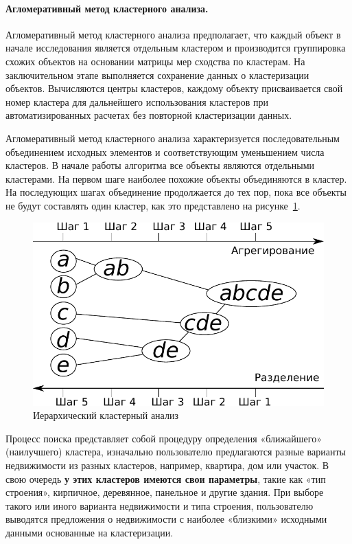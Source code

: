 \documentclass[a4paper,14pt,openany,final]{extreport} %
\def\oldcaption{} \let\oldcaption=\caption
\def\caption{\stepcounter{captionsnum}\oldcaption}
\begin{document}
{\paragraph{Агломеративный метод кластерного анализа.}
Агломеративный метод кластерного анализа предполагает, что каждый объект в начале исследования является отдельным кластером и производится группировка схожих объектов на основании матрицы мер сходства по кластерам. На заключительном этапе выполняется сохранение данных о кластеризации объектов. Вычисляются центры кластеров, каждому объекту присваивается свой номер кластера для дальнейшего использования кластеров при автоматизированных расчетах без повторной кластеризации данных.

Агломеративный метод кластерного анализа характеризуется последовательным объединением исходных элементов и соответствующим уменьшением числа кластеров. В начале работы алгоритма все объекты являются отдельными кластерами. На первом шаге наиболее похожие объекты объединяются в кластер. На последующих шагах объединение продолжается до тех пор, пока все объекты не будут составлять один кластер, как это представлено на рисунке~\ref{fig:hclustdescr}.

\begin{figure}[htbp]
  \centering
  \includegraphics[width=0.5\linewidth]{hclustexp.pdf}
  \caption{Иерархический кластерный анализ}
  \label{fig:hclustdescr}
\end{figure}


Процесс поиска представляет собой процедуру определения «ближайшего» (наилучшего) кластера, изначально пользователю предлагаются разные варианты недвижимости из разных кластеров, например, квартира, дом или участок. В свою очередь\textbf{ у этих кластеров имеются свои параметры}, такие как «тип строения», кирпичное, деревянное, панельное и другие здания. При выборе такого или иного варианта недвижимости и типа строения, пользователю выводятся предложения о недвижимости с наиболее «близкими» исходными данными основанные на кластеризации.

}
\end{document}
